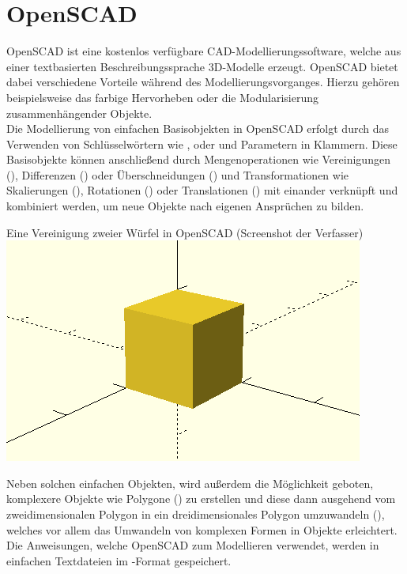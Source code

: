 \section{OpenSCAD}
OpenSCAD ist eine kostenlos verfügbare CAD-Modellierungssoftware, welche aus einer textbasierten Beschreibungssprache 3D-Modelle erzeugt.
OpenSCAD bietet dabei verschiedene Vorteile während des Modellierungsvorganges.
Hierzu gehören beispielsweise das farbige Hervorheben oder die Modularisierung zusammenhängender Objekte. \\
Die Modellierung von einfachen Basisobjekten in OpenSCAD erfolgt durch das Verwenden von Schlüsselwörtern wie ,  oder  und Parametern in Klammern.
Diese Basisobjekte können anschließend durch Mengenoperationen wie Vereinigungen (), Differenzen () oder Überschneidungen () und Transformationen wie Skalierungen (), Rotationen () oder Translationen () mit einander verknüpft und kombiniert werden, um neue Objekte nach eigenen Ansprüchen zu bilden.
\begin{Bild}{Eine Vereinigung zweier Würfel in OpenSCAD (Screenshot der Verfasser)}
	\includegraphics{Bilder/OpenSCAD_Union}
\end{Bild}
Neben solchen einfachen Objekten, wird außerdem die Möglichkeit geboten, komplexere Objekte wie Polygone () zu erstellen und diese dann ausgehend vom zweidimensionalen Polygon in ein dreidimensionales Polygon umzuwandeln (), welches vor allem das Umwandeln von komplexen Formen in Objekte erleichtert. \\
Die Anweisungen, welche OpenSCAD zum Modellieren verwendet, werden in einfachen Textdateien im -Format gespeichert.
